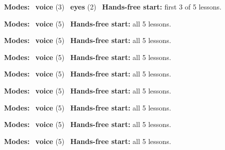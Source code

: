 \expandafter\def\csname hlchaptermodality49\endcsname{%
  {\small\noindent
    \textbf{Modes:} \hlvoicesign{}~\textbf{voice} (3) \quad \hlsightsign{}~\textbf{eyes} (2)\quad
    \hlvoicesign{}~\textbf{Hands-free start:} first 3 of 5 lessons.%
    \par}\medskip
}

\expandafter\def\csname hlchaptermodality50\endcsname{%
  {\small\noindent
    \textbf{Modes:} \hlvoicesign{}~\textbf{voice} (5)\quad
    \hlvoicesign{}~\textbf{Hands-free start:} all 5 lessons.%
    \par}\medskip
}

\expandafter\def\csname hlchaptermodality51\endcsname{%
  {\small\noindent
    \textbf{Modes:} \hlvoicesign{}~\textbf{voice} (5)\quad
    \hlvoicesign{}~\textbf{Hands-free start:} all 5 lessons.%
    \par}\medskip
}

\expandafter\def\csname hlchaptermodality52\endcsname{%
  {\small\noindent
    \textbf{Modes:} \hlvoicesign{}~\textbf{voice} (5)\quad
    \hlvoicesign{}~\textbf{Hands-free start:} all 5 lessons.%
    \par}\medskip
}

\expandafter\def\csname hlchaptermodality53\endcsname{%
  {\small\noindent
    \textbf{Modes:} \hlvoicesign{}~\textbf{voice} (5)\quad
    \hlvoicesign{}~\textbf{Hands-free start:} all 5 lessons.%
    \par}\medskip
}

\expandafter\def\csname hlchaptermodality54\endcsname{%
  {\small\noindent
    \textbf{Modes:} \hlvoicesign{}~\textbf{voice} (5)\quad
    \hlvoicesign{}~\textbf{Hands-free start:} all 5 lessons.%
    \par}\medskip
}

\expandafter\def\csname hlchaptermodality55\endcsname{%
  {\small\noindent
    \textbf{Modes:} \hlvoicesign{}~\textbf{voice} (5)\quad
    \hlvoicesign{}~\textbf{Hands-free start:} all 5 lessons.%
    \par}\medskip
}

\expandafter\def\csname hlchaptermodality56\endcsname{%
  {\small\noindent
    \textbf{Modes:} \hlvoicesign{}~\textbf{voice} (5)\quad
    \hlvoicesign{}~\textbf{Hands-free start:} all 5 lessons.%
    \par}\medskip
}

\expandafter\def\csname hlchaptermodality57\endcsname{%
  {\small\noindent
    \textbf{Modes:} \hlvoicesign{}~\textbf{voice} (5)\quad
    \hlvoicesign{}~\textbf{Hands-free start:} all 5 lessons.%
    \par}\medskip
}

